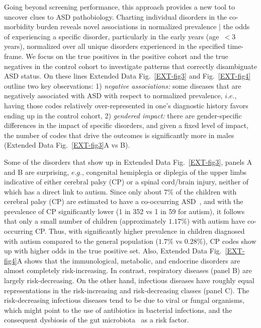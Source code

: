 \documentclass[3p,super,numbers,sort&compress,preprint,10pt]{elsarticle}
\def\treatment{positive\xspace}
\begin{document}
Going beyond screening performance, this approach provides a new tool to uncover clues to ASD pathobiology. Charting individual disorders in the co-morbidity burden reveals novel associations in normalized prevalence | the odds of experiencing a specific disorder, particularly in the early years (age~$<3$ years), normalized over all unique disorders experienced in the specified time-frame. We focus on  the true positives in the \treatment cohort and the true negatives in the control cohort to investigate  patterns that correctly disambiguate  ASD status. On these lines Extended Data Fig.~\ref{EXT-fig3} and Fig.~\ref{EXT-fig4} outline two key  observations: 1) \textit{negative associations:} some  diseases that are negatively associated with ASD  with respect to normalized prevalence, $i.e.$, having those codes relatively  over-represented  in one's diagnostic history favors ending up in the control cohort, 2) \textit{gendered impact:} there are gender-specific differences in the impact of specific disorders,  and given a fixed level of impact, the number of codes that drive the outcomes is significantly more in males (Extended Data Fig.~\ref{EXT-fig3}A vs B).

Some of the disorders that show up in Extended Data Fig.~\ref{EXT-fig3}, panels A and B are surprising, $e.g.$,  congenital hemiplegia or diplegia of the upper limbs indicative of either  cerebral palsy (CP) or a spinal cord/brain injury, neither of which has a direct  link to autism. Since only about $7\%$ of the children with  cerebral palsy (CP) are estimated to have a  co-occurring ASD~\cite{cdccp,christensen2014prevalence}, and with the prevalence of CP  significantly lower  (1 in 352 vs 1 in 59 for autism), it follows that  only a small number of children (approximately $1.17\%$) with autism have co-occurring CP. Thus, with significantly higher prevalence in children diagnosed with autism compared to the general population ($1.7\%$ vs $0.28\%$), CP codes show  up with higher odds in the true positive set. Also, Extended Data Fig.~\ref{EXT-fig4}A shows that the immunological, metabolic, and endocrine disorders are almost completely risk-increasing. In contrast, respiratory diseases (panel B) are largely risk-decreasing. On the other hand, infectious diseases have roughly equal representations in the risk-increasing and risk-decreasing classes (panel C).
The risk-decreasing infectious diseases tend to be due to viral or fungal organisms, which might point to the use of antibiotics in bacterial infections, and the consequent dysbiosis of the gut microbiota~\cite{pmid30823414,pmid27957319} as a risk factor.
\end{document}
